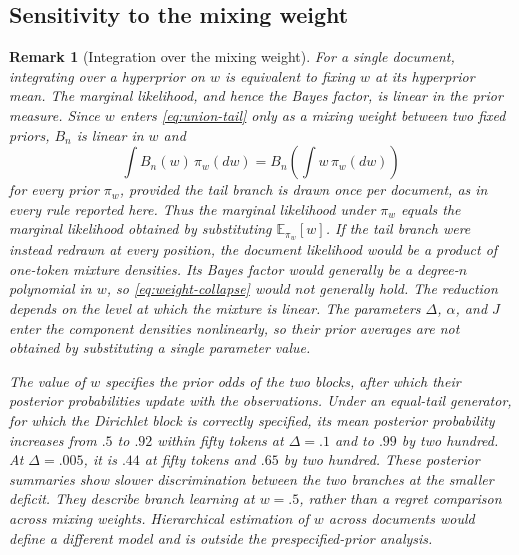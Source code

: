 \documentclass[11pt]{article}
\newtheorem{remark}{Remark}
\newcommand{\E}{\mathbb E}
\begin{document}
\FloatBarrier
\subsection{Sensitivity to the mixing weight}
\label{sec:union-weight-sweep}

\begin{remark}[Integration over the mixing weight]
\label{rem:union-weight}
For a single document, integrating over a hyperprior on $w$ is equivalent to fixing
$w$ at its hyperprior mean.  The marginal likelihood, and hence the Bayes factor,
is linear in the prior measure.  Since $w$ enters \eqref{eq:union-tail} only as a
mixing weight between two fixed priors, $B_n$ is linear in $w$ and
\begin{equation}
  \int B_n(w)\,\pi_w(dw)=B_n\!\left(\int w\,\pi_w(dw)\right)
  \label{eq:weight-collapse}
\end{equation}
for every prior $\pi_w$, provided the tail branch is drawn once per document, as in
every rule reported here.  Thus the marginal likelihood under $\pi_w$ equals the
marginal likelihood obtained by substituting $\E_{\pi_w}[w]$.  If the tail branch
were instead redrawn at every position, the document likelihood would be a product
of one-token mixture densities.  Its Bayes factor would generally be a degree-$n$
polynomial in $w$, so \eqref{eq:weight-collapse} would not generally hold.
The reduction depends on the level at which the mixture is linear.  The
parameters $\Delta$, $\alpha$, and $J$ enter the
component densities nonlinearly, so their prior averages are not obtained by
substituting a single parameter value.

The value of $w$ specifies the prior odds of the two blocks, after which their
posterior probabilities update with the observations.  Under an equal-tail
generator, for which the Dirichlet block is correctly specified, its mean posterior
probability increases from $.5$ to $.92$ within fifty tokens at $\Delta=.1$ and to
$.99$ by two hundred.  At $\Delta=.005$, it is $.44$ at fifty tokens and $.65$ by
two hundred.  These posterior summaries show slower discrimination
between the two branches at the smaller deficit.  They describe branch learning
at $w=.5$, rather than a regret comparison across mixing weights.
Hierarchical estimation of $w$ across documents would define a different model and
is outside the prespecified-prior analysis.
\end{remark}
\end{document}
